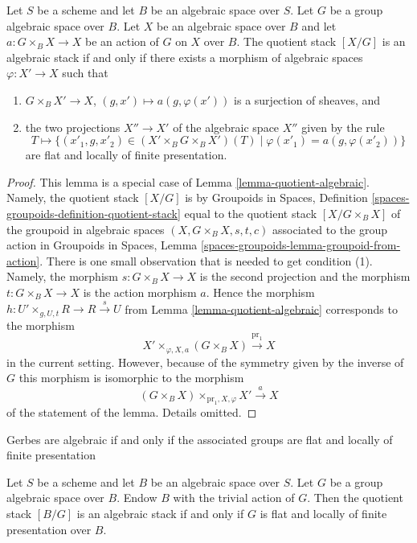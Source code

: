 \begin{lemma}
\label{lemma-group-quotient-algebraic}
Let $S$ be a scheme and let $B$ be an algebraic space over $S$.
Let $G$ be a group algebraic space over $B$.
Let $X$ be an algebraic space over $B$ and let $a : G \times_B X \to X$
be an action of $G$ on $X$ over $B$.
The quotient stack $[X/G]$ is an algebraic stack if and only if
there exists a morphism of algebraic spaces $\varphi : X' \to X$ such that
\begin{enumerate}
\item $G \times_B X' \to X$, $(g, x') \mapsto a(g, \varphi(x'))$ is a
surjection of sheaves, and
\item the two projections $X'' \to X'$ of the algebraic space $X''$
given by the rule
$$
T \longmapsto \{(x'_1, g, x'_2) \in (X' \times_B G \times_B X')(T)
\mid \varphi(x'_1) = a(g, \varphi(x'_2))\}
$$
are flat and locally of finite presentation.
\end{enumerate}
\end{lemma}

\begin{proof}
This lemma is a special case of
Lemma \ref{lemma-quotient-algebraic}.
Namely, the quotient stack $[X/G]$ is by
Groupoids in Spaces, Definition \ref{spaces-groupoids-definition-quotient-stack}
equal to the quotient stack $[X/G \times_B X]$ of the groupoid in
algebraic spaces $(X, G \times_B X, s, t, c)$ associated to
the group action in
Groupoids in Spaces, Lemma \ref{spaces-groupoids-lemma-groupoid-from-action}.
There is one small observation that is needed to get condition (1).
Namely, the morphism $s : G \times_B X \to X$ is the second projection
and the morphism $t :  G \times_B X \to X$ is the action morphism $a$.
Hence the morphism $h : U' \times_{g, U, t} R \to R \xrightarrow{s} U$ from
Lemma \ref{lemma-quotient-algebraic}
corresponds to the morphism
$$
X' \times_{\varphi, X, a} (G \times_B X) \xrightarrow{\text{pr}_1} X
$$
in the current setting. However, because of the symmetry given by
the inverse of $G$ this morphism is isomorphic to the morphism
$$
(G \times_B X) \times_{\text{pr}_1, X, \varphi} X' \xrightarrow{a} X
$$
of the statement of the lemma. Details omitted.
\end{proof}

\begin{lemma}
\label{lemma-BG-algebraic}
\begin{slogan}
Gerbes are algebraic if and only if the associated groups are flat
and locally of finite presentation
\end{slogan}
Let $S$ be a scheme and let $B$ be an algebraic space over $S$.
Let $G$ be a group algebraic space over $B$.
Endow $B$ with the trivial action of $G$.
Then the quotient stack $[B/G]$ is an algebraic stack
if and only if $G$ is flat and locally of finite presentation over $B$.
\end{lemma}

